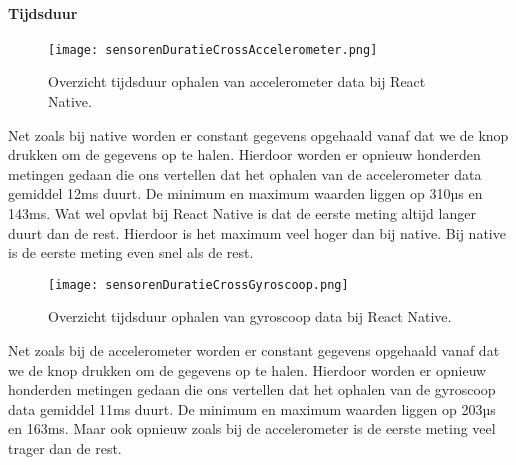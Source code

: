 \paragraph{Tijdsduur}
\begin{figure}[H]
    \centering
    \texttt{[image: sensorenDuratieCrossAccelerometer.png]}
    \caption{Overzicht tijdsduur ophalen van accelerometer data bij React Native.}
\end{figure}
Net zoals bij native worden er constant gegevens opgehaald vanaf dat we de knop drukken om de
gegevens op te halen. Hierdoor worden er opnieuw honderden metingen gedaan die ons vertellen dat het ophalen
van de accelerometer data gemiddel 12ms duurt. De minimum en maximum waarden liggen op 310µs en 143ms.
Wat wel opvlat bij React Native is dat de eerste meting altijd langer duurt dan de rest. 
Hierdoor is het maximum veel hoger dan bij native. Bij native is de eerste meting even snel als de rest. 
\begin{figure}[H]
    \centering
    \texttt{[image: sensorenDuratieCrossGyroscoop.png]}
    \caption{Overzicht tijdsduur ophalen van gyroscoop data bij React Native.}
\end{figure}
Net zoals bij de accelerometer worden er constant gegevens opgehaald vanaf dat we de knop drukken om de 
gegevens op te halen. Hierdoor worden er opnieuw honderden metingen gedaan die ons vertellen dat het ophalen
van de gyroscoop data gemiddel 11ms duurt. De minimum en maximum waarden liggen op 203µs en 163ms.
Maar ook opnieuw zoals bij de accelerometer is de eerste meting veel trager dan de rest.

